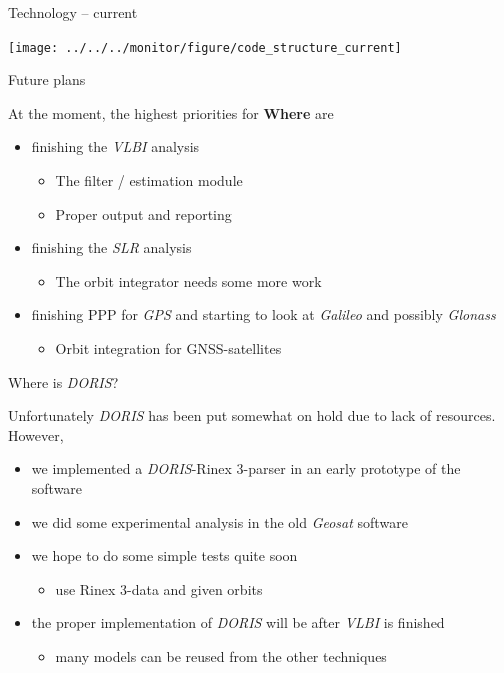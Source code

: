 \documentclass[ignorenonframetext,12pt,t]{beamer}
\providecommand{\tightlist}{%
  \setlength{\itemsep}{0pt}\setlength{\parskip}{0pt}}
\begin{document}
\begin{frame}{Technology -- current}

\texttt{[image: ../../../monitor/figure/code\_structure\_current]}

\end{frame}

\begin{frame}{Future plans}

At the moment, the highest priorities for \textbf{Where} are

\begin{itemize}
\item
  finishing the \emph{VLBI} analysis

  \begin{itemize}
  \item
    The filter / estimation module
  \item
    Proper output and reporting
  \end{itemize}
\item
  finishing the \emph{SLR} analysis

  \begin{itemize}
  \tightlist
  \item
    The orbit integrator needs some more work
  \end{itemize}
\item
  finishing PPP for \emph{GPS} and starting to look at \emph{Galileo}
  and possibly \emph{Glonass}

  \begin{itemize}
  \tightlist
  \item
    Orbit integration for GNSS-satellites
  \end{itemize}
\end{itemize}

\end{frame}

\begin{frame}{Where is \emph{DORIS}?}

Unfortunately \emph{DORIS} has been put somewhat on hold due to lack of
resources. However,

\begin{itemize}
\item
  we implemented a \emph{DORIS}-Rinex 3-parser in an early prototype of
  the software
\item
  we did some experimental analysis in the old \emph{Geosat} software
\item
  we hope to do some simple tests quite soon

  \begin{itemize}
  \tightlist
  \item
    use Rinex 3-data and given orbits
  \end{itemize}
\item
  the proper implementation of \emph{DORIS} will be after \emph{VLBI} is
  finished

  \begin{itemize}
  \tightlist
  \item
    many models can be reused from the other techniques
  \end{itemize}
\end{itemize}

\end{frame}
\end{document}
